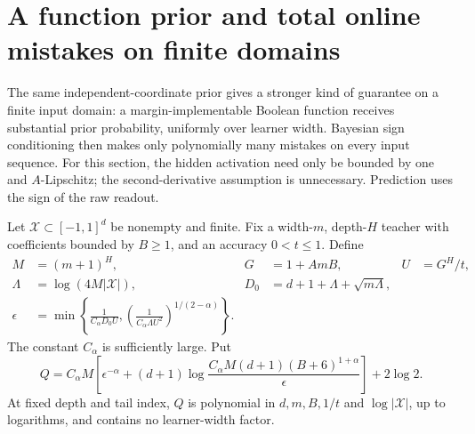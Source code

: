 \section{A function prior and total online mistakes on finite domains}
\label{sec:uniform-online}
The same independent-coordinate prior gives a stronger kind of guarantee on a finite input domain: a margin-implementable Boolean function receives substantial prior probability, uniformly over learner width. Bayesian sign conditioning then makes only polynomially many mistakes on every input sequence. For this section, the hidden activation need only be bounded by one and $A$-Lipschitz; the second-derivative assumption is unnecessary. Prediction uses the sign of the raw readout.

Let $\mathcal X\subset[-1,1]^d$ be nonempty and finite. Fix a width-$m$, depth-$H$ teacher with coefficients bounded by $B\ge1$, and an accuracy $0<t\le1$. Define
\begin{align}
 M&=(m+1)^H,&G&=1+AmB,& U&=G^H/t,\\
 \Lambda&=\log(4M|\mathcal X|),&
 D_0&=d+1+\Lambda+\sqrt{m\Lambda},\\
 \epsilon&=\min\left\{\frac1{C_\alpha D_0U},
              \left(\frac1{C_\alpha\Lambda U^2}\right)^{1/(2-\alpha)}\right\}.
 \label{eq:uniform-epsilon}
\end{align}
The constant $C_\alpha$ is sufficiently large. Put
\begin{equation}
 Q=C_\alpha M\left[\epsilon^{-\alpha}+(d+1)
 \log\frac{C_\alpha M(d+1)(B+6)^{1+\alpha}}\epsilon\right]+2\log2.
 \label{eq:uniform-resource}
\end{equation}
At fixed depth and tail index, $Q$ is polynomial in $d,m,B,1/t$ and $\log|\mathcal X|$, up to logarithms, and contains no learner-width factor.

